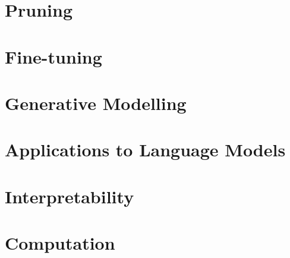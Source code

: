 \documentclass[nobib,oneside]{tufte-book}
\begin{document}


\chapter{Pruning}\label{ch:pruning}



\chapter{Fine-tuning}\label{ch:finetuning}



\chapter{Generative Modelling}



\chapter{Applications to Language Models}\label{ch:application_llm}



\chapter{Interpretability}



\chapter{Computation}



\backmatter




\printindex
\end{document}

